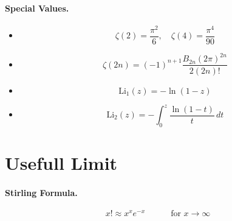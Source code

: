 \documentclass{article}
\begin{document}
\paragraph{Special Values.}
\begin{itemize}
    \item 
    \[
    \zeta(2) = \frac{\pi^2}{6}, \quad \zeta(4) = \frac{\pi^4}{90}
    \]
    \item 
    \[
    \zeta(2n) = (-1)^{n+1} \frac{B_{2n} (2\pi)^{2n}}{2 (2n)!}
    \]
    \item 
    \[
    \text{Li}_1(z) = -\ln(1-z)
    \]
    \item 
    \[
    \text{Li}_2(z) = -\int_0^z \frac{\ln(1-t)}{t} \, dt
    \]
\end{itemize}

\section{Usefull Limit}
\paragraph{Stirling Formula.}
\[
x! \approx x^{x} e^{-x} \quad\quad\quad \text{for } x \longrightarrow \infty 
\]
\end{document}
